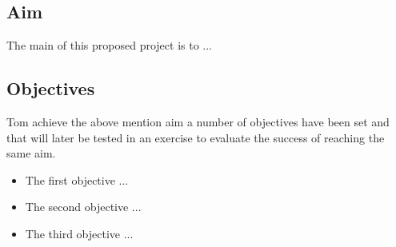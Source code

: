 \subsection{Aim}
The main of this proposed project is to ...

\subsection{Objectives}
Tom achieve the above mention aim a number of objectives have been set
and that will later be tested in an exercise to evaluate the success of
reaching the same aim.

\begin{itemize}
	\item The first objective ...
	\item The second objective ...
	\item The third objective ...
\end{itemize}
